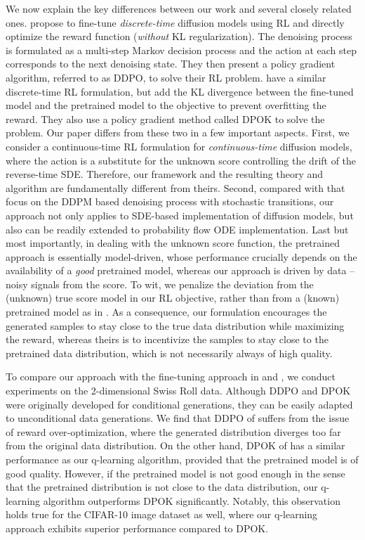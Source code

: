 \documentclass[11pt]{article}
\begin{document}
We now explain the key differences between our work and several closely related ones. \cite{black2023training} propose to fine-tune \textit{discrete-time} diffusion models using RL and directly optimize the reward function (\textit{without} KL regularization).
The denoising process is formulated as a multi-step Markov decision process and the action at each step corresponds to the next denoising state. They then present a policy gradient algorithm, referred to as DDPO, to solve their RL problem.
\cite{fan2024reinforcement} have a similar discrete-time RL formulation, but  add the KL divergence between the fine-tuned model and the pretrained model to the objective to prevent overfitting the reward. They also use a policy gradient method called  DPOK to solve the problem.
Our paper differs from these two in a few important aspects.
First, we consider a continuous-time RL formulation for \textit{continuous-time} diffusion models, where the action is a substitute for the unknown score controlling the drift of the reverse-time SDE. Therefore, our framework and the resulting theory and algorithm are fundamentally different from theirs. Second, compared with \cite{black2023training, fan2024reinforcement} that focus on the DDPM based denoising process with stochastic transitions, our approach not only applies to SDE-based implementation of diffusion models, but also can be readily extended to probability flow ODE implementation. Last but most importantly, in dealing with the unknown score function, the pretrained approach is essentially model-driven, whose performance crucially depends on the availability of a {\it good} pretrained model, whereas our approach is driven by data --  noisy signals from the score. To wit, we penalize the deviation from the (unknown) true score model in our RL objective, rather than from a (known) pretrained model as in \cite{fan2024reinforcement}. As a consequence, our formulation encourages the generated samples to stay close to the true data distribution while maximizing the reward, whereas theirs is to incentivize the samples to stay close to the pretrained data distribution, which is not necessarily always of high quality.



To compare our approach with the fine-tuning approach in \cite{black2023training} and \cite{fan2024reinforcement}, we conduct experiments on the 2-dimensional Swiss Roll data. Although DDPO and DPOK were originally developed for conditional generations, they can be easily adapted to unconditional data generations.
We find that DDPO of \cite{black2023training} suffers from the issue of reward over-optimization, where the generated distribution diverges too far from the original data distribution.
On the other hand, DPOK of \cite{fan2024reinforcement} has a similar performance as our q-learning algorithm, provided that the pretrained model is of good quality. However, if the pretrained model is not good enough in the sense that the pretrained distribution is not close to the data distribution, our q-learning algorithm outperforms DPOK significantly. Notably, this observation holds true for the CIFAR-10 image dataset as well, where our q-learning approach exhibits superior performance compared to DPOK.
\end{document}
